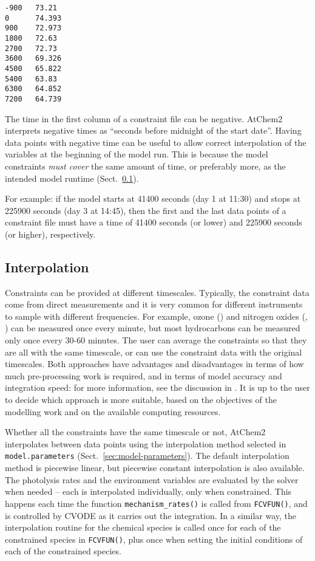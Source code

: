 \begin{verbatim}
-900   73.21
0      74.393
900    72.973
1800   72.63
2700   72.73
3600   69.326
4500   65.822
5400   63.83
6300   64.852
7200   64.739
\end{verbatim}

The time in the first column of a constraint file can be negative.
AtChem2 interprets negative times as ``seconds before midnight of the
start date''. Having data points with negative time can be useful to
allow correct interpolation of the variables at the beginning of the
model run. This is because the model constraints \emph{must cover} the
same amount of time, or preferably more, as the intended model runtime
(Sect.~\ref{subsec:interpolation}).

For example: if the model starts at 41400 seconds (day 1 at 11:30) and
stops at 225900 seconds (day 3 at 14:45), then the first and the last
data points of a constraint file must have a time of 41400 seconds (or
lower) and 225900 seconds (or higher), respectively.

\subsection{Interpolation} \label{subsec:interpolation}

Constraints can be provided at different timescales. Typically, the
constraint data come from direct measurements and it is very common
for different instruments to sample with different frequencies. For
example, ozone () and nitrogen oxides (, ) can
be measured once every minute, but most hydrocarbons can be measured
only once every 30-60 minutes. The user can average the constraints so
that they are all with the same timescale, or can use the constraint
data with the original timescales. Both approaches have advantages and
disadvantages in terms of how much pre-processing work is required,
and in terms of model accuracy and integration speed: for more
information, see the discussion in \citet{sommariva_2020}. It is up to
the user to decide which approach is more suitable, based on the
objectives of the modelling work and on the available computing
resources.

Whether all the constraints have the same timescale or not, AtChem2
interpolates between data points using the interpolation method
selected in \texttt{model.parameters} (Sect.~\ref{sec:model-parameters}).
The default interpolation method is piecewise linear, but piecewise
constant interpolation is also available. The photolysis rates and the
environment variables are evaluated by the solver when needed -- each
is interpolated individually, only when constrained. This happens each
time the function \texttt{mechanism\_rates()} is called from
\texttt{FCVFUN()}, and is controlled by CVODE as it carries out the
integration. In a similar way, the interpolation routine for the
chemical species is called once for each of the constrained species in
\texttt{FCVFUN()}, plus once when setting the initial conditions of
each of the constrained species.


